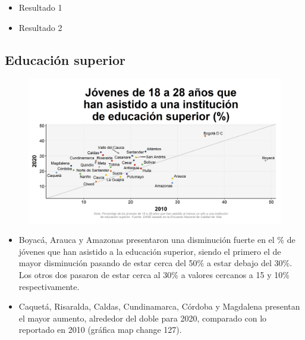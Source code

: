     
    \begin{tcolorbox}[enhanced, colback=mycolor,colframe=mycolor,drop fuzzy shadow,watermark color=white,
                        title=Principales Resultados]
    
            \begin{itemize}
                    \item Resultado 1 
                    \item Resultado 2
            \end{itemize}
     
    \end{tcolorbox}


    \subsection{Educación superior}

    \begin{figure}[H]
        \caption[Jóvenes de 18 a 28 años que han asistido a una institución de educación superior por departamentos - 2010 VS 2020 ]{\label{asist_edusup_dpto_scatter} }
        \begin{center}
        \includegraphics[width=\textwidth,keepaspectratio]{img/var_127_scatter_time.png}
        \end{center}
    \end{figure}
            \begin{itemize}
                \item Boyacá, Arauca y Amazonas presentaron una disminución fuerte en el \% de jóvenes que han asistido a la educación superior, siendo el primero el de mayor disminución pasando de estar cerca del 50\% a estar debajo del 30\%. Los otros dos pasaron de estar cerca al 30\% a valores cercanos a 15 y 10\% respectivamente.
                \item Caquetá, Risaralda, Caldas, Cundinamarca, Córdoba y Magdalena presentan el mayor aumento, alrededor del doble para 2020, comparado con lo reportado en 2010 (gráfica map change 127).
                \end{itemize}

